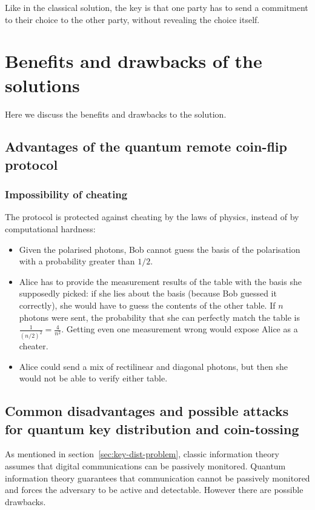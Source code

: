 \documentclass[oneside,a4paper]{article}
\begin{document}
Like in the classical solution, the key is that one party has to send a commitment to their choice to the other party, without revealing the choice itself.

\section{Benefits and drawbacks of the solutions}
Here we discuss the benefits and drawbacks to the solution.

\subsection{Advantages of the quantum remote coin-flip protocol}

\subsubsection{Impossibility of cheating}
The protocol is protected against cheating by the laws of physics, instead of by computational hardness:

\begin{itemize}
	\item Given the polarised photons, Bob cannot guess the basis of the polarisation with a probability greater than $1/2$.
	\item Alice has to provide the measurement results of the table with the basis she supposedly picked: if she lies about the basis (because Bob guessed it correctly), she would have to guess the contents of the other table.
	If $n$ photons were sent, the probability that she can perfectly match the table is $\frac{1}{(n/2)^2}=\frac{4}{n^2}$.
	Getting even one measurement wrong would expose Alice as a cheater.
	\item Alice could send a mix of rectilinear and diagonal photons, but then she would not be able to verify either table.
\end{itemize}

\subsection{Common disadvantages and possible attacks for quantum key distribution and coin-tossing}
As mentioned in section~\ref{sec:key-dist-problem}, classic information theory assumes that digital communications can be passively monitored. Quantum information theory guarantees that communication cannot be passively monitored and forces the adversary to be active and detectable. However there are possible drawbacks.
\end{document}
